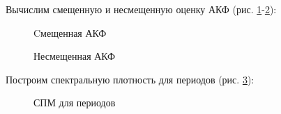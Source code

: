 \documentclass[a4paper,oneside,14pt]{extreport}
\begin{document}
Вычислим смещенную и несмещенную оценку АКФ (рис. \ref{task3_acf_biased}-\ref{task3_acf_unbiased}):
\begin{figure}[!h]
	\caption{Cмещенная АКФ}
	\label{task3_acf_biased}
\end{figure}

\newpage
\begin{figure}[!h]
	\caption{Несмещенная АКФ}
	\label{task3_acf_unbiased}
\end{figure}

Построим спектральную плотность для периодов (рис. \ref{task3_psd_periods}):
\begin{figure}[!h]
	\caption{СПМ для периодов}
	\label{task3_psd_periods}
\end{figure}
\end{document}
